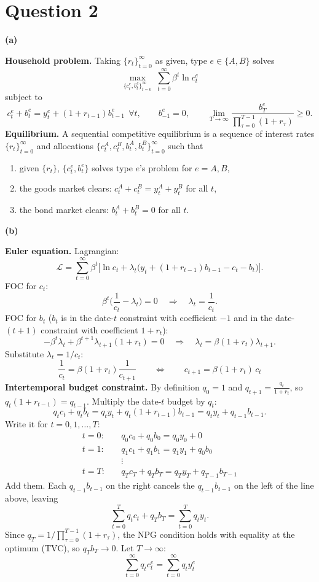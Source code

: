 \documentclass[12pt]{article}
\newcommand{\pt}[1]{\par\bigskip\textbf{(#1)}\par}
\newcommand{\ans}[1]{\[\boxed{\ #1\ }\]}
\begin{document}
\section*{Question 2}

\pt{a}
\textbf{Household problem.} Taking $\{r_t\}_{t=0}^\infty$ as given, type
$e\in\{A,B\}$ solves
\[
\max_{\{c^e_t,b^e_t\}_{t=0}^\infty}\ \sum_{t=0}^\infty\beta^t\ln c^e_t
\]
subject to
\[
c^e_t+b^e_t=y^e_t+(1+r_{t-1})b^e_{t-1}\ \ \forall t,\qquad b^e_{-1}=0,\qquad
\lim_{T\to\infty}\frac{b^e_T}{\prod_{\tau=0}^{T-1}(1+r_\tau)}\ge0 .
\]
\textbf{Equilibrium.} A sequential competitive equilibrium is a sequence
of interest rates $\{r_t\}_{t=0}^\infty$ and allocations
$\{c^A_t,c^B_t,b^A_t,b^B_t\}_{t=0}^\infty$ such that
\begin{enumerate}
\item given $\{r_t\}$, $\{c^e_t,b^e_t\}$ solves type $e$'s problem for $e=A,B$,
\item the goods market clears: $c^A_t+c^B_t=y^A_t+y^B_t$ for all $t$,
\item the bond market clears: $b^A_t+b^B_t=0$ for all $t$.
\end{enumerate}

\pt{b}
\textbf{Euler equation.} Lagrangian:
\[
\mathcal L=\sum_{t=0}^\infty\beta^t\Big[\ln c_t+\lambda_t\big(y_t+(1+r_{t-1})b_{t-1}-c_t-b_t\big)\Big].
\]
FOC for $c_t$:
\[
\beta^t\Big(\frac{1}{c_t}-\lambda_t\Big)=0\quad\Longrightarrow\quad\lambda_t=\frac{1}{c_t}.
\]
FOC for $b_t$ ($b_t$ is in the date-$t$ constraint with coefficient $-1$ and
in the date-$(t+1)$ constraint with coefficient $1+r_t$):
\[
-\beta^t\lambda_t+\beta^{t+1}\lambda_{t+1}(1+r_t)=0\quad\Longrightarrow\quad\lambda_t=\beta(1+r_t)\lambda_{t+1}.
\]
Substitute $\lambda_t=1/c_t$:
\ans{\frac{1}{c_t}=\beta(1+r_t)\frac{1}{c_{t+1}}\qquad\Longleftrightarrow\qquad c_{t+1}=\beta(1+r_t)\,c_t}
\textbf{Intertemporal budget constraint.} By definition $q_0=1$ and
$q_{t+1}=\frac{q_t}{1+r_t}$, so $q_t(1+r_{t-1})=q_{t-1}$. Multiply the
date-$t$ budget by $q_t$:
\[
q_tc_t+q_tb_t=q_ty_t+q_t(1+r_{t-1})b_{t-1}=q_ty_t+q_{t-1}b_{t-1}.
\]
Write it for $t=0,1,\dots,T$:
\begin{align*}
t=0:&\quad q_0c_0+q_0b_0=q_0y_0+0\\
t=1:&\quad q_1c_1+q_1b_1=q_1y_1+q_0b_0\\
&\quad\vdots\\
t=T:&\quad q_Tc_T+q_Tb_T=q_Ty_T+q_{T-1}b_{T-1}
\end{align*}
Add them. Each $q_{t-1}b_{t-1}$ on the right cancels the $q_{t-1}b_{t-1}$
on the left of the line above, leaving
\[
\sum_{t=0}^Tq_tc_t+q_Tb_T=\sum_{t=0}^Tq_ty_t .
\]
Since $q_T=1/\prod_{\tau=0}^{T-1}(1+r_\tau)$, the NPG condition holds with
equality at the optimum (TVC), so $q_Tb_T\to0$. Let $T\to\infty$:
\ans{\sum_{t=0}^\infty q_tc^e_t=\sum_{t=0}^\infty q_ty^e_t}
\end{document}

